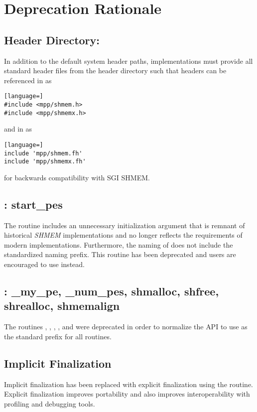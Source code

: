 \section{Deprecation Rationale}\label{subsec:dep_rationale}

\subsection{Header Directory: }
\label{subsec:dep_rationale:mpp}
In addition to the default system header paths, \openshmem implementations
must provide all \openshmem standard header files from the 
header directory such that headers can be referenced in \CorCpp as
\begin{lstlisting}[language=]
#include <mpp/shmem.h>
#include <mpp/shmemx.h>
\end{lstlisting}
and in \Fortran as
\begin{lstlisting}[language=]
include 'mpp/shmem.fh'
include 'mpp/shmemx.fh'
\end{lstlisting}
for backwards compatibility with SGI SHMEM.

\subsection{\CorCpp: start\_pes}
The \CorCpp routine  includes an unnecessary initialization
argument that is remnant of historical \emph{SHMEM} implementations and no
longer reflects the requirements of modern \openshmem implementations.
Furthermore, the naming of  does not include the standardized
\shmemprefixLC{} naming prefix. This routine has been deprecated and
\openshmem users are encouraged to use
\hyperref[subsec:shmem_init]{} instead.

\subsection{\CorCpp: \_my\_pe, \_num\_pes, shmalloc, shfree, shrealloc, shmemalign}
The \CorCpp routines , , ,
,  and  were deprecated in order
to normalize the \openshmem \ac{API} to use \shmemprefixLC{} as the standard
prefix for all routines.

\subsection{Implicit Finalization}
Implicit finalization has been replaced with explicit finalization using the
 routine.  Explicit finalization improves portability and
also improves interoperability with profiling and debugging tools.

